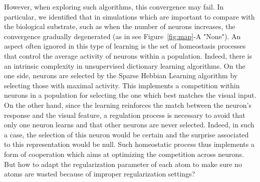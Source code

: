 \documentclass[vision,article,submit,oneauthor,pdftex]{Definitions/mdpi}
\begin{document}
However, when exploring such algorithms, this convergence may fail. In particular, we identified that in simulations which are important to compare with the biological substrate, such as when the number of neurons increases, the convergence gradually degenerated (as in see Figure~\ref{fig:map}-A "None"). An aspect often ignored in this type of learning is the set of homeostasis processes that control the average activity of neurons within a population. Indeed, there is an intrinsic complexity in unsupervised dictionary learning algorithms. On the one side, neurons are selected by the Sparse Hebbian Learning algorithm by selecting those with maximal activity. This implements a competition within neurons in a population for selecting the one which best matches the visual input. On the other hand, since the learning reinforces the match between the neuron's response and the visual feature, a regulation process is necessary to avoid that only one neuron learns and that other neurons are never selected. Indeed, in such a case, the selection of this neuron would be certain and the surprise associated to this representation would be null. Such homeostatic process thus implements a form of cooperation which aims at optimizing the competition across neurons. But how to adapt the regularization parameter of each atom to make sure no atoms are wasted because of improper regularization settings?
\end{document}
